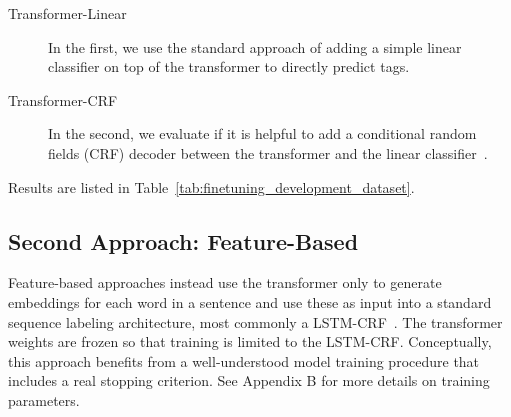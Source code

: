 \documentclass[11pt,a4paper]{article}
\begin{document}
\begin{description}
\vspace{-1mm}
\item[Transformer-Linear] In the first, we use the standard approach of adding a simple linear classifier on top of the transformer to directly predict tags. 
\vspace{-1mm}
\item[Transformer-CRF] In the second, we evaluate if it is helpful to add a conditional random fields (CRF) decoder between the transformer and the linear classifier~\cite{souza2019portuguese}. 
\end{description}
\vspace{-1mm}
\noindent
Results are listed in Table~\ref{tab:finetuning_development_dataset}.




























\subsection{Second Approach: Feature-Based}
\label{sec:feature_based}
\vspace{-1mm}

Feature-based approaches instead use the transformer only to generate embeddings for each word in a sentence and use these as input into a standard sequence labeling architecture, most commonly a LSTM-CRF~\cite{2015arXiv150801991H}. The transformer weights are frozen so that training is limited to the LSTM-CRF. Conceptually, this approach benefits from a well-understood model training procedure that includes a real stopping criterion. See Appendix B for more details on training parameters. 
\end{document}
